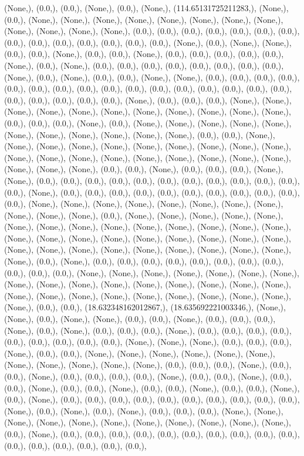 \documentclass{article}
\begin{document}
(None,), (0.0,), (0.0,), (None,), (0.0,), (None,), (114.65131725211283,), (None,), (0.0,), (None,), (None,), (None,), (None,), (None,), (None,), (None,), (None,), (None,), (None,), (None,), (None,), (0.0,), (0.0,), (0.0,), (0.0,), (0.0,), (0.0,), (0.0,), (0.0,), (0.0,), (0.0,), (0.0,), (0.0,), (0.0,), (0.0,), (None,), (0.0,), (None,), (None,), (0.0,), (0.0,), (None,), (0.0,), (0.0,), (None,), (0.0,), (0.0,), (0.0,), (0.0,), (0.0,), (None,), (0.0,), (None,), (0.0,), (0.0,), (0.0,), (0.0,), (0.0,), (0.0,), (0.0,), (0.0,), (None,), (0.0,), (None,), (0.0,), (0.0,), (None,), (None,), (0.0,), (0.0,), (0.0,), (0.0,), (0.0,), (0.0,), (0.0,), (0.0,), (0.0,), (0.0,), (0.0,), (0.0,), (0.0,), (0.0,), (0.0,), (0.0,), (0.0,), (0.0,), (0.0,), (0.0,), (0.0,), (None,), (0.0,), (0.0,), (0.0,), (None,), (None,), (None,), (None,), (None,), (None,), (None,), (None,), (None,), (None,), (None,), (0.0,), (0.0,), (0.0,), (None,), (0.0,), (None,), (None,), (None,), (None,), (None,), (None,), (None,), (None,), (None,), (None,), (None,), (0.0,), (0.0,), (None,), (None,), (None,), (None,), (None,), (None,), (None,), (None,), (None,), (None,), (None,), (None,), (None,), (None,), (None,), (None,), (None,), (None,), (None,), (None,), (None,), (None,), (0.0,), (0.0,), (None,), (0.0,), (0.0,), (0.0,), (None,), (None,), (0.0,), (0.0,), (0.0,), (0.0,), (0.0,), (0.0,), (0.0,), (0.0,), (0.0,), (0.0,), (0.0,), (0.0,), (None,), (0.0,), (0.0,), (0.0,), (0.0,), (0.0,), (0.0,), (0.0,), (0.0,), (0.0,), (0.0,), (0.0,), (None,), (None,), (None,), (None,), (None,), (None,), (None,), (None,), (None,), (None,), (None,), (0.0,), (None,), (None,), (None,), (None,), (None,), (None,), (None,), (None,), (None,), (None,), (None,), (None,), (None,), (None,), (None,), (None,), (None,), (None,), (None,), (None,), (None,), (None,), (None,), (None,), (None,), (None,), (None,), (None,), (None,), (None,), (None,), (None,), (None,), (0.0,), (None,), (0.0,), (0.0,), (0.0,), (0.0,), (0.0,), (0.0,), (0.0,), (0.0,), (0.0,), (0.0,), (0.0,), (None,), (None,), (None,), (None,), (None,), (None,), (None,), (None,), (None,), (None,), (None,), (None,), (None,), (None,), (None,), (None,), (None,), (None,), (None,), (None,), (None,), (None,), (None,), (None,), (None,), (None,), (0.0,), (0.0,), (18.632348162012867,), (18.635692221003346,), (None,), (None,), (0.0,), (None,), (None,), (0.0,), (0.0,), (None,), (0.0,), (0.0,), (0.0,), (None,), (0.0,), (None,), (0.0,), (0.0,), (0.0,), (None,), (0.0,), (0.0,), (0.0,), (0.0,), (0.0,), (0.0,), (0.0,), (0.0,), (0.0,), (None,), (None,), (None,), (0.0,), (0.0,), (0.0,), (None,), (0.0,), (0.0,), (None,), (None,), (None,), (None,), (None,), (None,), (None,), (None,), (None,), (None,), (None,), (0.0,), (0.0,), (0.0,), (None,), (0.0,), (0.0,), (None,), (0.0,), (0.0,), (0.0,), (0.0,), (None,), (0.0,), (0.0,), (None,), (0.0,), (0.0,), (None,), (0.0,), (0.0,), (None,), (0.0,), (0.0,), (None,), (0.0,), (0.0,), (None,), (0.0,), (None,), (0.0,), (0.0,), (0.0,), (0.0,), (0.0,), (0.0,), (0.0,), (0.0,), (0.0,), (0.0,), (None,), (0.0,), (None,), (0.0,), (None,), (0.0,), (0.0,), (0.0,), (None,), (None,), (None,), (None,), (None,), (None,), (None,), (None,), (None,), (None,), (None,), (0.0,), (None,), (0.0,), (0.0,), (0.0,), (0.0,), (0.0,), (0.0,), (0.0,), (0.0,), (0.0,), (0.0,), (0.0,), (0.0,), (0.0,), (0.0,), (0.0,), (0.0,), 
\end{document}
